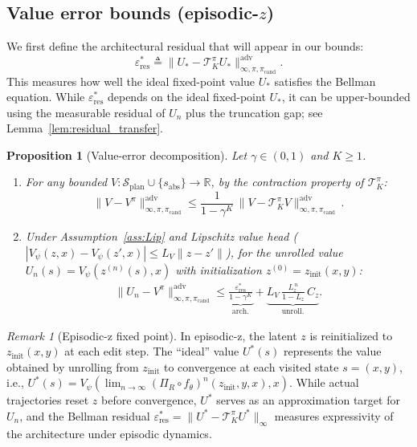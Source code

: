 \documentclass{article}
\theoremstyle{plain}
\newtheorem{proposition}[theorem]{Proposition}
\theoremstyle{definition}
\theoremstyle{remark}
\newtheorem{remark}[theorem]{Remark}
\newcommand{\longonly}[1]{}
\newcommand{\longonly}[1]{#1}
\newcommand{\R}{\mathbb{R}}
\begin{document}
\subsection{Value error bounds (episodic-$z$)}
\label{sec:value_error_bounds}

We first define the architectural residual that will appear in our bounds:
\begin{equation}
\varepsilon_{\mathrm{res}}^* \triangleq \|U_* - \mathcal{T}^\pi_K U_*\|_{\infty,\pi,\pi_{\mathrm{cand}}}^{\mathrm{adv}}.
\label{eq:eps_res_def}
\end{equation}
This measures how well the ideal fixed-point value $U_*$ satisfies the Bellman equation.
While $\varepsilon_{\mathrm{res}}^*$ depends on the ideal fixed-point $U_*$, it can be upper-bounded using the measurable residual of $U_n$ plus the truncation gap; see Lemma~\ref{lem:residual_transfer}.

\begin{proposition}[Value-error decomposition]
\label{prop:error_bounds}
Let $\gamma\in(0,1)$ and $K\ge 1$.
\begin{enumerate}
\item For any bounded $V:\mathcal{S}_{\mathrm{plan}}\cup\{s_{\mathrm{abs}}\}\to\R$, by the contraction property of $\mathcal{T}^\pi_K$\longonly{ (Lemma~\ref{lem:Kstep_contraction})}:
\begin{equation}
\|V - V^\pi\|_{\infty,\pi,\pi_{\mathrm{cand}}}^{\mathrm{adv}}
\le
\frac{1}{1-\gamma^K}\,
\|V-\mathcal{T}^\pi_K V\|_{\infty,\pi,\pi_{\mathrm{cand}}}^{\mathrm{adv}}\,.
\label{eq:boundA}
\end{equation}
\item Under Assumption~\ref{ass:Lip} and Lipschitz value head ($|V_\psi(z,x)-V_\psi(z',x)|\le L_V\|z-z'\|$), for the unrolled value $U_n(s)=V_\psi(z^{(n)}(s),x)$ with initialization $z^{(0)} = z_{\mathrm{init}}(x,y)$:
\begin{align}
\|U_n - V^\pi\|_{\infty,\pi,\pi_{\mathrm{cand}}}^{\mathrm{adv}}
\le
\underbrace{\frac{\varepsilon_{\mathrm{res}}^*}{1-\gamma^K}}_{\text{arch.}}
+
\underbrace{L_V\,\frac{L_z^{\,n}}{1-L_z}\,C_z}_{\text{unroll.}}.
\label{eq:epsV_dials}
\end{align}
\end{enumerate}
\end{proposition}

\begin{remark}[Episodic-z fixed point]
\label{rem:episodic_z_fp}
In episodic-z, the latent $z$ is reinitialized to $z_{\text{init}}(x,y)$ at each edit step. The ``ideal'' value $U^*(s)$ represents the value obtained by unrolling from $z_{\text{init}}$ to convergence at each visited state $s=(x,y)$, i.e., $U^*(s) = V_\psi(\lim_{n\to\infty} (\Pi_R \circ f_\theta)^n(z_{\text{init}}, y, x), x)$. While actual trajectories reset $z$ before convergence, $U^*$ serves as an approximation target for $U_n$, and the Bellman residual $\varepsilon^*_{\text{res}} = \|U^* - \mathcal{T}^\pi_K U^*\|_\infty$ measures expressivity of the architecture under episodic dynamics.
\end{remark}
\end{document}
